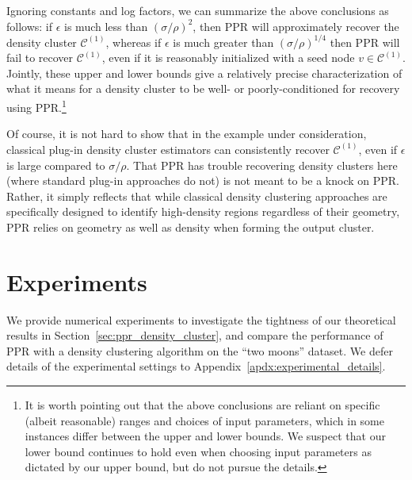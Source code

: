 \documentclass[twoside,11pt]{article}
\newcommand{\1}{\mathbf{1}}
\newcommand{\mc}[1]{\mathcal{#1}}
\begin{document}
Ignoring constants and log factors, we can summarize the above conclusions as follows: if $\epsilon$ is much less than $(\sigma/\rho)^2$, then PPR will approximately recover the density cluster $\mc{C}^{(1)}$, whereas if $\epsilon$ is much greater than $(\sigma/\rho)^{1/4}$ then PPR will fail to recover $\mc{C}^{(1)}$, even if it is reasonably initialized with a seed node $v \in \mc{C}^{(1)}$. Jointly, these upper and lower bounds give a relatively precise characterization of what it means for a density cluster to be well- or poorly-conditioned for recovery using PPR.\footnote{It is worth pointing out that the above conclusions are reliant on specific (albeit reasonable) ranges and choices of input parameters, which in some instances differ between the upper and lower bounds. We suspect that our lower bound continues to hold even when choosing input parameters as dictated by our upper bound, but do not pursue the details.}

Of course, it is not hard to show that in the example under consideration, classical plug-in density cluster estimators can consistently recover $\mc{C}^{(1)}$, even if $\epsilon$ is large compared to $\sigma/\rho$. That PPR has trouble recovering density clusters here (where standard plug-in approaches do not) is not meant to be a knock on PPR. Rather, it simply reflects that while classical density clustering approaches are specifically designed to identify high-density regions regardless of their geometry, PPR relies on geometry as well as density when forming the output cluster. 

\section{Experiments}
\label{sec:experiments}
We provide numerical experiments to investigate the tightness of our theoretical results in Section~\ref{sec:ppr_density_cluster}, and compare the performance of PPR with a density clustering algorithm on the ``two moons'' dataset. We defer details of the experimental settings to Appendix~\ref{apdx:experimental_details}.   
\end{document}
